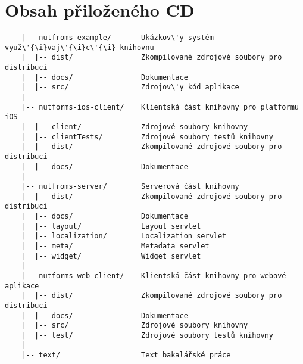 

\chapter{Obsah přiloženého CD}


\begin{verbatim}
    |-- nutfroms-example/       Ukázkov\'y systém využ\'{\i}vaj\'{\i}c\'{\i} knihovnu
    |  |-- dist/                Zkompilované zdrojové soubory pro distribuci
    |  |-- docs/                Dokumentace
    |  |-- src/                 Zdrojov\'y kód aplikace
    |
    |-- nutforms-ios-client/    Klientská část knihovny pro platformu iOS
    |  |-- client/              Zdrojové soubory knihovny
    |  |-- clientTests/         Zdrojové soubory testů knihovny
    |  |-- dist/                Zkompilované zdrojové soubory pro distribuci
    |  |-- docs/                Dokumentace
    |
    |-- nutfroms-server/        Serverová část knihovny
    |  |-- dist/                Zkompilované zdrojové soubory pro distribuci
    |  |-- docs/                Dokumentace
    |  |-- layout/              Layout servlet
    |  |-- localization/        Localization servlet
    |  |-- meta/                Metadata servlet
    |  |-- widget/              Widget servlet
    |
    |-- nutforms-web-client/    Klientská část knihovny pro webové aplikace
    |  |-- dist/                Zkompilované zdrojové soubory pro distribuci
    |  |-- docs/                Dokumentace
    |  |-- src/                 Zdrojové soubory knihovny
    |  |-- test/                Zdrojové soubory testů knihovny
    |
    |-- text/                   Text bakalářské práce
\end{verbatim}
